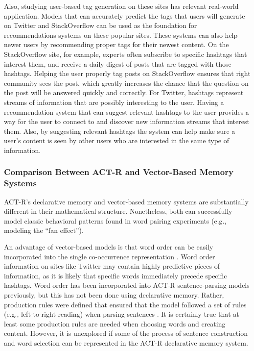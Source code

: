 \documentclass[man,floatsintext,donotrepeattitle]{apa6}
\begin{document}
Also, studying user-based tag generation on these sites has relevant real-world application.
Models that can accurately predict the tags that users will generate on Twitter and StackOverflow can be used as the foundation for recommendations systems on these popular sites.
These systems can also help newer users by recommending proper tags for their newest content.
On the StackOverflow site, for example, experts often subscribe to specific hashtags that interest them, and receive a daily digest of posts that are tagged with those hashtags.
Helping the user properly tag posts on StackOverflow ensures that right community sees the post, which greatly increases the chance that the question on the post will be answered quickly and correctly.
For Twitter, hashtags represent streams of information that are possibly interesting to the user.
Having a recommendation system that can suggest relevant hashtags to the user provides a way for the user to connect to and discover new information streams that interest them.
Also, by suggesting relevant hashtags the system can help make sure a user's content is seen by other users who are interested in the same type of information.

\subsubsection{Comparison Between ACT-R and Vector-Based Memory Systems}

ACT-R's declarative memory and vector-based memory systems are substantially different in their mathematical structure.
Nonetheless, both can successfully model classic behavioral patterns found in word pairing experiments (e.g., \cite{Rutledge2008} modeling the ``fan effect'').

An advantage of vector-based models is that word order can be easily incorporated into the single co-occurrence representation \parencite{Jones2007}.
Word order information on sites like Twitter may contain highly predictive pieces of information, as it is likely that specific words immediately precede specific hashtags.
Word order has been incorporated into ACT-R sentence-parsing models previously, but this has not been done using declarative memory.
Rather, production rules were defined that ensured that the model followed a set of rules (e.g., left-to-right reading) when parsing sentences \parencite{Lewis2006}.
It is certainly true that at least some production rules are needed when choosing words and creating content. 
However, it is unexplored if some of the process of sentence construction and word selection can be represented in the ACT-R declarative memory system.
\end{document}
